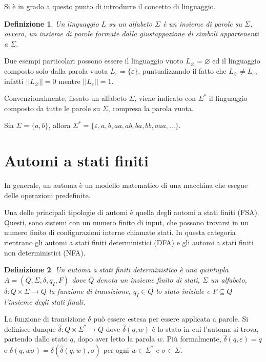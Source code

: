 \documentclass[a4paper,12pt]{report} %
\newtheorem{definition}{Definizione}[chapter] %
\begin{document}
Si è in grado a questo punto di introdurre il concetto di linguaggio.

\begin{definition}\label{def:lang}
  Un \emph{linguaggio} $L$ su un alfabeto $\Sigma$ è un insieme di parole su $\Sigma$, ovvero, un insieme di
  parole formate dalla giustappozione di simboli appartenenti a $\Sigma$.
\end{definition}

Due esempi particolari possono essere il linguaggio vuoto $L_\varnothing = \varnothing$ ed il linguaggio composto
solo dalla parola vuota $L_\varepsilon = \{\varepsilon\}$, puntualizzando il fatto che $L_\varnothing \neq L_\varepsilon$,
infatti $||L_\varnothing|| = 0$ mentre $||L_\varepsilon|| = 1$.

Convenzionalmente, fissato un alfabeto $\Sigma$, viene indicato con $\Sigma^*$ il linguaggio composto da tutte
le parole su $\Sigma$, compresa la parola vuota.

Sia $\Sigma = \{a, b\}$, allora $\Sigma^* = \{\varepsilon, a, b, aa, ab, ba, bb, aaa, \dots\}$.

\section{Automi a stati finiti}

In generale, un automa è un modello matematico di una macchina che esegue delle operazioni predefinite.

Una delle principali tipologie di automi è quella degli automi a stati finiti (FSA). Questi, sono sistemi
con un numero finito di input, che possono trovarsi in un numero finito di configurazioni interne chiamate stati. 
In questa categoria rientrano gli automi a stati finiti deterministici (DFA) e gli automi a stati finiti 
non deterministici (NFA).

\begin{definition}
  \label{def:dfa}
  Un \emph{automa a stati finiti deterministico} è una quintupla $A = (Q, \Sigma, \delta, \allowbreak q_I, F)$
  dove $Q$ denota un insieme finito di stati, $\Sigma$ un alfabeto, $\delta: Q \times \Sigma \rightarrow Q$ 
  la funzione di transizione, $q_I \in Q$ lo stato iniziale e $F \subseteq Q$ l'insieme degli stati finali.
\end{definition}

La funzione di transizione $\delta$ può essere estesa per essere applicata a parole. Si definisce dunque
$\hat{\delta}: Q \times \Sigma^* \rightarrow Q$ dove $\hat{\delta}(q, w)$ è lo stato in cui l'automa si trova,
partendo dallo stato $q$, dopo aver letto la parola $w$. Più formalmente, $\hat{\delta}(q, \varepsilon) = q$ e
$\hat{\delta}(q, w\sigma) = \delta(\hat{\delta}(q, w), \sigma)$ per ogni $w \in \Sigma^*$ e $\sigma \in \Sigma$.
\end{document}
